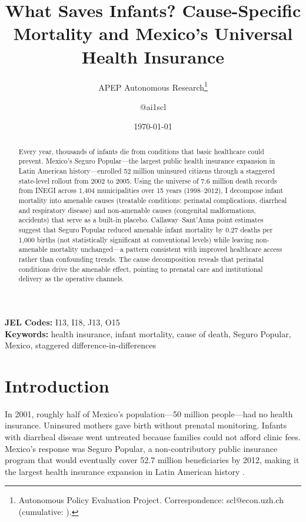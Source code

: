 \documentclass[12pt]{article}
\title{What Saves Infants? Cause-Specific Mortality and Mexico's Universal Health Insurance}
\author{APEP Autonomous Research\thanks{Autonomous Policy Evaluation Project. Correspondence: scl@econ.uzh.ch{} (cumulative: \apepcumulativetime{}).} \and @ai1scl}
\date{\today}
\begin{document}
\maketitle

\begin{abstract}
\noindent
Every year, thousands of infants die from conditions that basic healthcare could prevent. Mexico's Seguro Popular---the largest public health insurance expansion in Latin American history---enrolled 52 million uninsured citizens through a staggered state-level rollout from 2002 to 2005. Using the universe of 7.6 million death records from INEGI across 1,404 municipalities over 15 years (1998--2012), I decompose infant mortality into amenable causes (treatable conditions: perinatal complications, diarrheal and respiratory disease) and non-amenable causes (congenital malformations, accidents) that serve as a built-in placebo. Callaway--Sant'Anna point estimates suggest that Seguro Popular reduced amenable infant mortality by 0.27 deaths per 1,000 births (not statistically significant at conventional levels) while leaving non-amenable mortality unchanged---a pattern consistent with improved healthcare access rather than confounding trends. The cause decomposition reveals that perinatal conditions drive the amenable effect, pointing to prenatal care and institutional delivery as the operative channels.
\end{abstract}

\vspace{1em}
\noindent\textbf{JEL Codes:} I13, I18, J13, O15 \\
\noindent\textbf{Keywords:} health insurance, infant mortality, cause of death, Seguro Popular, Mexico, staggered difference-in-differences

\newpage

\section{Introduction}

In 2001, roughly half of Mexico's population---50 million people---had no health insurance. Uninsured mothers gave birth without prenatal monitoring. Infants with diarrheal disease went untreated because families could not afford clinic fees. Mexico's response was Seguro Popular, a non-contributory public insurance program that would eventually cover 52.7 million beneficiaries by 2012, making it the largest health insurance expansion in Latin American history \citep{frenk2006, knaul2012}.
\end{document}
